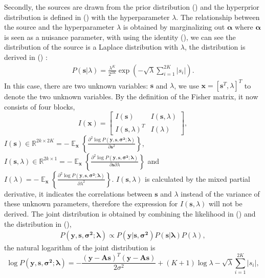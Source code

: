 \documentclass[proposal]{umthesis}          %
\begin{document}
\noindent
Secondly, the sources are drawn from the prior distribution () and the hyperprior distribution is defined in () with the hyperparameter $\lambda$. 
The relationship between the source and the hyperparameter $\lambda$ is obtained by marginalizing out $\mathbf{\alpha}$ where $\mathbf{\alpha}$ is seen as a nuisance parameter, with using the identity (), we can see the distribution of the source is a Laplace distribution with $\lambda$, the distribution is derived in () :
\begin{align} \label{eqt:laplace_prior_fisher_2}
P(\boldsymbol{s} | \lambda ) = \frac{\lambda ^{K}}{2^{2K}} \exp(-\sqrt{\lambda}\sum_{i=1}^{2K}|s_{i}|).
\end{align}  
In this case, there are two unknown variables: $\mathbf{s}$ and $\lambda$, we use $\mathbf{x} = [\mathbf{s}^{T}, \lambda]^{T}$ to denote the two unknown variables. By the definition of the Fisher matrix, it now consists of four blocks,
\begin{equation}
I(\boldsymbol{x}) = \begin{bmatrix}
I(\mathbf{s}) & I(\mathbf{s},\lambda) \\ 
I(\mathbf{s},\lambda)^{T} & I(\lambda)
\end{bmatrix},
\end{equation}
 $I(\mathbf{s}) \in \mathbb{R}^{2k \times 2K} = -\mathop{\mathbb{E}}_{\mathbf{x}} \left \{  \frac{\partial^{2} \log P(\mathbf{y,s,\sigma^{2};\lambda})}{\partial \mathbf{s}^2} \right \}$,
$I(\mathbf{s},\lambda) \in \mathbb{R}^{2k \times 1} = -\mathop{\mathbb{E}}_{\mathbf{x}}\left \{ \frac{\partial^{2} \log P(\mathbf{y,s,\sigma^{2};\lambda})}{\partial \mathbf{s}\partial \lambda}\right \}$ and $I(\lambda)  = -\mathop{\mathbb{E}}_{\mathbf{x}}\left \{ \frac{\partial^{2} \log P(\mathbf{y,s,\sigma^{2};\lambda})}{\partial \lambda^2} \right \}$.
$I(\mathbf{s},\lambda)$ is calculated by the mixed partial derivative, it indicates the correlations between $\mathbf{s}$ and $\lambda$ instead of the variance of these unknown parameters, therefore the expression for $I(\mathbf{s},\lambda)$ will not be derived.
The joint distribution is obtained by combining the likelihood in () and the distribution in (),
\begin{align} \label{eqt:likelihood_fisher_2}
P(\mathbf{y,s,\sigma^{2};\lambda}) \propto  P(\mathbf{y|s,\sigma^{2}})P(\mathbf{s|\lambda})P(\lambda),
\end{align}  
the natural logarithm of the joint distribution is 
\begin{equation}
\log P(\mathbf{y,s,\sigma^{2};\lambda})  = - \frac{(\mathbf{y-As})^{T}(\mathbf{y-As})}{2\sigma^{2}} + (K+1) \log \lambda -\sqrt{\lambda}\sum_{i=1}^{2K}|s_{i}|,
\end{equation}
\end{document}
